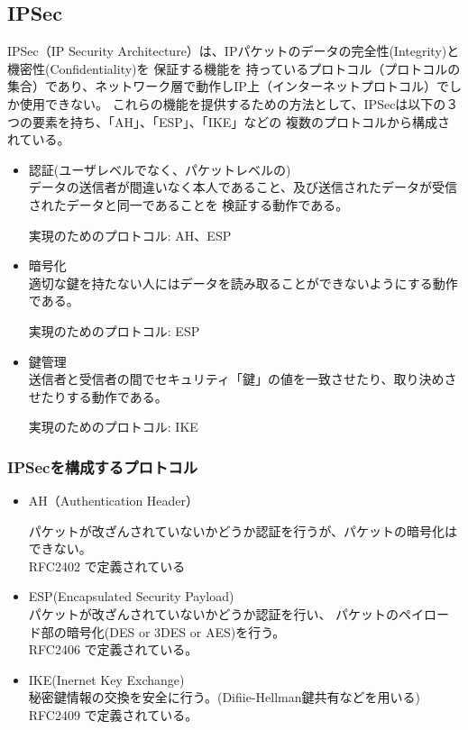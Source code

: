 \documentclass[11pt,a4j,titlepage]{jreport}
\begin{document}
\subsection{IPSec}
IPSec（IP Security Architecture）は、IPパケットのデータの完全性(Integrity)と機密性(Confidentiality)を
保証する機能を
持っているプロトコル（プロトコルの集合）であり、ネットワーク層で動作しIP上（インターネットプロトコル）でしか使用できない。
これらの機能を提供するための方法として、IPSecは以下の３つの要素を持ち、「AH」、「ESP」、「IKE」などの
複数のプロトコルから構成されている。
\begin{itemize}
    \item 認証(ユーザレベルでなく、パケットレベルの)\mbox{}\\
    データの送信者が間違いなく本人であること、及び送信されたデータが受信されたデータと同一であることを
    検証する動作である。\par
    実現のためのプロトコル: AH、ESP
    \item 暗号化\mbox{}\\
    適切な鍵を持たない人にはデータを読み取ることができないようにする動作である。\par
    実現のためのプロトコル: ESP
    \item 鍵管理\mbox{}\\
    送信者と受信者の間でセキュリティ「鍵」の値を一致させたり、取り決めさせたりする動作である。\par
    実現のためのプロトコル: IKE
\end{itemize}

\subsubsection{IPSecを構成するプロトコル}

\begin{itemize}
    \item AH（Authentication Header）\mbox{}\par
    パケットが改ざんされていないかどうか認証を行うが、パケットの暗号化はできない。\\RFC2402 \cite{RFC2402}で定義されている

    \item ESP(Encapsulated Security Payload)\mbox{}\\
    パケットが改ざんされていないかどうか認証を行い、
    パケットのペイロード部の暗号化(DES or 3DES or AES)を行う。\\RFC2406 \cite{RFC2406}で定義されている。 
    \item IKE(Inernet Key Exchange)\mbox{}\\
    秘密鍵情報の交換を安全に行う。(Difiie-Hellman鍵共有などを用いる)
    \\RFC2409 \cite{RFC2409}で定義されている。
\end{itemize}
\end{document}
